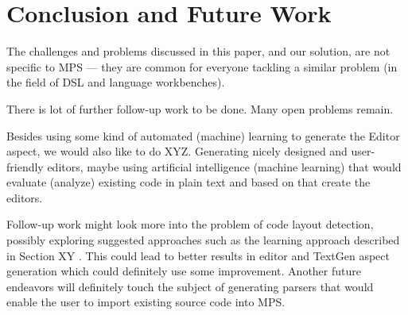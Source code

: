 \section{Conclusion and Future Work}

 The challenges and problems discussed in this paper, and our solution, are not specific to MPS --- they are common for everyone tackling a similar problem (in the field of DSL and language workbenches).


There is lot of further follow-up work to be done. Many open problems remain.

Besides using some kind of automated (machine) learning to generate the Editor aspect, we would also like to do XYZ.
Generating nicely designed and user-friendly editors, maybe using artificial intelligence (machine learning) that would evaluate (analyze) existing code in plain text and based on that create the editors.

Follow-up work might look more into the problem of code layout detection, possibly exploring suggested approaches such as the learning approach described in Section XY .
This could lead to better results in editor and TextGen aspect generation which could definitely use some improvement.
Another future endeavors will definitely touch the subject of generating parsers that would enable the user to import existing source code into MPS.

